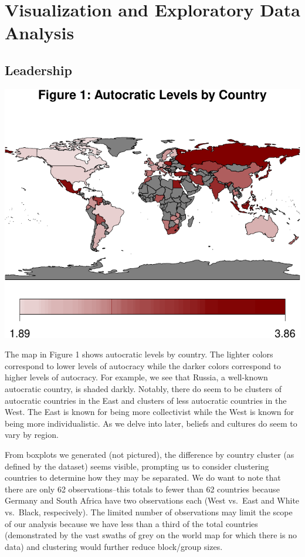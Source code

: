 \documentclass[
]{article}
\begin{document}
\hypertarget{visualization-and-exploratory-data-analysis}{%
\section{Visualization and Exploratory Data
Analysis}\label{visualization-and-exploratory-data-analysis}}

\hypertarget{leadership}{%
\subsection{Leadership}\label{leadership}}

\begin{center}\includegraphics[width=0.95\linewidth]{globe_report_files/figure-latex/leadership-1} \end{center}

The map in Figure 1 shows autocratic levels by country. The lighter
colors correspond to lower levels of autocracy while the darker colors
correspond to higher levels of autocracy. For example, we see that
Russia, a well-known autocratic country, is shaded darkly. Notably,
there do seem to be clusters of autocratic countries in the East and
clusters of less autocratic countries in the West. The East is known for
being more collectivist while the West is known for being more
individualistic. As we delve into later, beliefs and cultures do seem to
vary by region.

From boxplots we generated (not pictured), the difference by country
cluster (as defined by the dataset) seems visible, prompting us to
consider clustering countries to determine how they may be separated. We
do want to note that there are only 62 observations--this totals to
fewer than 62 countries because Germany and South Africa have two
observations each (West vs.~East and White vs.~Black, respecively). The
limited number of observations may limit the scope of our analysis
because we have less than a third of the total countries (demonstrated
by the vast swaths of grey on the world map for which there is no data)
and clustering would further reduce block/group sizes.
\end{document}
